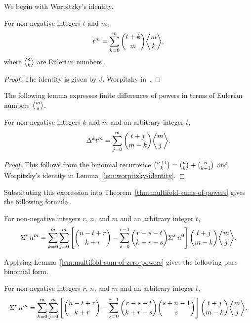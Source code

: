 We begin with Worpitzky's identity.
\begin{lemma}
  \label{lem:worpitzky-identity}
  For non-negative integers $t$ and $m$,
  \begin{align*}
    t^{m} = \sum_{k=0}^{m} \binom{t+k}{m} \eulerian{m}{k},
  \end{align*}
  where $\eulerian{n}{k}$ are Eulerian numbers.
  \begin{proof}
    The identity is given by J. Worpitzky in~\cite{Worpitzky1883}.
  \end{proof}
\end{lemma}
The following lemma expresses finite differences of powers in terms of Eulerian numbers $\eulerian{m}{s}$.
\begin{lemma}
  \label{lem:finite-differences-via-eulerian-numbers}
  For non-negative integers $k$ and $m$ and an arbitrary integer $t$,
  \begin{align*}
    \Delta^{k} t^{m} = \sum_{j=0}^{m} \binom{t+j}{m-k} \eulerian{m}{j}.
  \end{align*}
  \begin{proof}
    This follows from the binomial recurrence $\tbinom{n+1}{k} = \tbinom{n}{k} + \tbinom{n}{k-1}$ and Worpitzky's identity in Lemma~\eqref{lem:worpitzky-identity}.
  \end{proof}
\end{lemma}
Substituting this expression into Theorem~\eqref{thm:multifold-sums-of-powers} gives the following formula.
\begin{proposition}
  \label{prop:multifold-eulerian-sums}
  For non-negative integers $r$, $n$, and $m$ and an arbitrary integer $t$,
  \begin{align*}
    \KnuthRFoldSum{r}{n}{m}
    = \sum_{k=0}^{m} \sum_{j=0}^{m}
    \left[
      \binom{n-t+r}{k+r}
      -
      \sum_{s=0}^{r-1}
      \binom{r-s-t}{k+r-s}
      \KnuthRFoldSum{s}{n}{0}
    \right] \binom{t+j}{m-k} \eulerian{m}{j}.
  \end{align*}
\end{proposition}
Applying Lemma~\eqref{lem:multifold-sum-of-zero-powers} gives the following pure binomial form.
\begin{proposition}
  \label{prop:multifold-eulerian-binomial-sums}
  For non-negative integers $r$, $n$, and $m$ and an arbitrary integer $t$,
  \begin{align*}
    \KnuthRFoldSum{r}{n}{m}
    = \sum_{k=0}^{m} \sum_{j=0}^{m}
    \left[
      \binom{n-t+r}{k+r}
      -
      \sum_{s=0}^{r-1}
      \binom{r-s-t}{k+r-s}
      \binom{s+n-1}{s}
    \right] \binom{t+j}{m-k} \eulerian{m}{j}.
  \end{align*}
\end{proposition}
